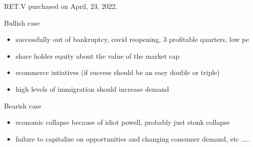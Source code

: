 RET.V
purchased on April, 23, 2022.

Bullish case
\begin{itemize}
    \item successfully out of bankruptcy, covid reopening, 3 profitable quarters, low pe
    \item share holder equity about the value of the market cap
    \item ecommerce intiatives (if success should be an easy double or triple)
    \item high levels of immigration should increase demand
\end{itemize}

Bearish case

\begin{itemize}
    \item economic collapse because of idiot powell, probably just stonk collapse
    \item failure to capitalize on opportunities and changing consumer demand, etc ....
\end{itemize}
